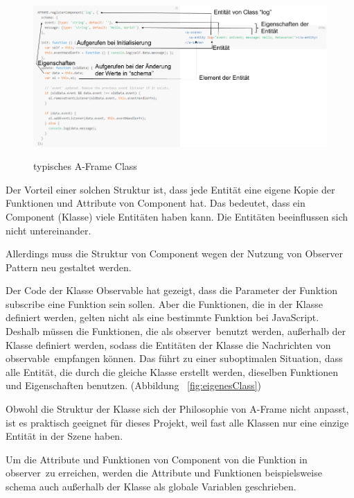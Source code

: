 \begin{figure}[ht]
\vspace*{1em}
\centering
\caption[Typisches A-Frame Class]{typisches A-Frame Class}
\includegraphics[width=\textwidth]{images/aframeClass.png}
\label{fig:aframeClass} 
\end{figure}
 
 Der Vorteil einer solchen Struktur ist, dass jede Entität eine eigene Kopie der Funktionen und Attribute von Component hat. Das bedeutet, dass ein Component (Klasse) viele Entitäten haben kann. Die Entitäten beeinflussen sich nicht untereinander.
 
 Allerdings muss die Struktur von Component wegen der Nutzung von Observer Pattern neu gestaltet werden.
 
 Der Code der Klasse {\selectfont Observable} hat gezeigt, dass die Parameter der Funktion {\selectfont subscribe} eine Funktion sein sollen. Aber die Funktionen, die in der Klasse definiert werden, gelten nicht als eine bestimmte Funktion bei JavaScript. Deshalb müssen die Funktionen, die als \glqq observer\grqq\ benutzt werden, außerhalb der Klasse definiert werden, sodass die Entitäten der Klasse die Nachrichten von \glqq observable\grqq\ empfangen können. Das führt zu einer suboptimalen Situation, dass alle Entität, die durch die gleiche Klasse erstellt werden, dieselben Funktionen und Eigenschaften benutzen. (Abbildung ~\ref{fig:eigenesClass})
 
 Obwohl die Struktur der Klasse sich der Philosophie von A-Frame nicht anpasst, ist es praktisch geeignet für dieses Projekt, weil fast alle Klassen nur eine einzige Entität in der Szene haben.
 
 Um die Attribute und Funktionen von Component von die Funktion in \glqq observer\grqq\ zu erreichen, werden die Attribute und Funktionen beispielsweise {\selectfont schema} auch außerhalb der Klasse als globale Variablen geschrieben.
 
